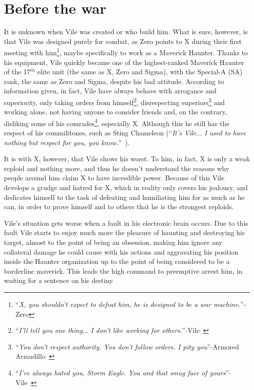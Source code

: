 \section{Before the war}
It is unknown when Vile was created or who build him. What is sure, however, is that Vile was designed purely for combat, as Zero points to X during their first meeting with him\footnote{``\textit{X, you shouldn't expect to defeat him, he is designed to be a war machine.}''- Zero}, maybe specifically to work as a Maverick Haunter. Thanks to his equipment, Vile quickly became one of the highest-ranked Maverick Haunter of the 17$^{th}$ elite unit (the same as X, Zero and Sigma), with the Special-A (SA) rank, the same as Zero and Sigma, despite his bad attitude. According to information given, in fact, Vile have always behave with arrogance and superiority, only taking orders from himself\footnote{``\textit{I'll tell you one thing$\dots$ I don't like working for others.}''-Vile~\cite{MHX:Vile_script}}, disrespecting superiors\footnote{``\textit{You don't respect authority. You don't follow orders. I pity you}''-Armored Armadillo~\cite{MHX:Vile_script}} and working alone, not having anyone to consider friends and, on the contrary, disliking some of his comrades\footnote{``\textit{I've always hated you, Storm Eagle. You and that smug face of yours}''-Vile~\cite{MHX:Vile_script}}, especially X. Although this he still has the respect of his commilitones, such as Sting Chameleon (``\textit{It's Vile$\dots$ I used to have nothing but respect for you, you know.}''~\cite{MHX:Vile_script}).

It is with X, however, that Vile shows his worst. To him, in fact, X is only a weak reploid and nothing more, and thus he doesn't understand the reasons why people around him claim X to have incredible power. Because of this Vile develops a grudge and hatred for X, which in reality only covers his jealousy, and dedicates himself to the task of defeating and humiliating him for as much as he can, in order to prove himself and to others that he is the strongest reploids.

Vile's situation gets worse when a fault in his electronic brain occurs. Due to this fault Vile starts to enjoy much more the pleasure of haunting and destroying his target, almost to the point of being an obsession, making him ignore any collateral damage he could cause with his actions and aggravating his position inside the Haunter organization up to the point of being considered to be a borderline maverick. This leads the high command  to preemptive arrest him, in waiting for a sentence on his destiny.

